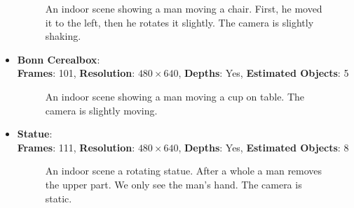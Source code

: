 \begin{itemize}
\begin{figure}[H]
\begin{center}
\end{center}
\caption[Dataset Bonn Chairs]{An indoor scene showing a man moving a chair. First, he moved it to the left, then he rotates it slightly. The camera is slightly shaking.}
\label{fig:eval_datasets_bonn_chairs}
\end{figure}
\item \textbf{Bonn Cerealbox}: \\
\textbf{Frames}: 101, \textbf{Resolution}: $480 \times 640$, \textbf{Depths}: Yes, \textbf{Estimated Objects}: 5
\begin{figure}[H]
\begin{center}
\end{center}
\caption[Dataset Bonn Cerealbox]{An indoor scene showing a man moving a cup on table. The camera is slightly moving.}
\label{fig:eval_datasets_bonn_cerealbox}
\end{figure}
\item \textbf{Statue}: \\
\textbf{Frames}: 111, \textbf{Resolution}: $480 \times 640$, \textbf{Depths}: Yes, \textbf{Estimated Objects}: 8
\begin{figure}[H]
\begin{center}
\end{center}
\caption[Dataset Statue]{An indoor scene a rotating statue. After a whole a man removes the upper part. We only see the man's hand. The camera is static.}

\end{figure}
\end{itemize}

